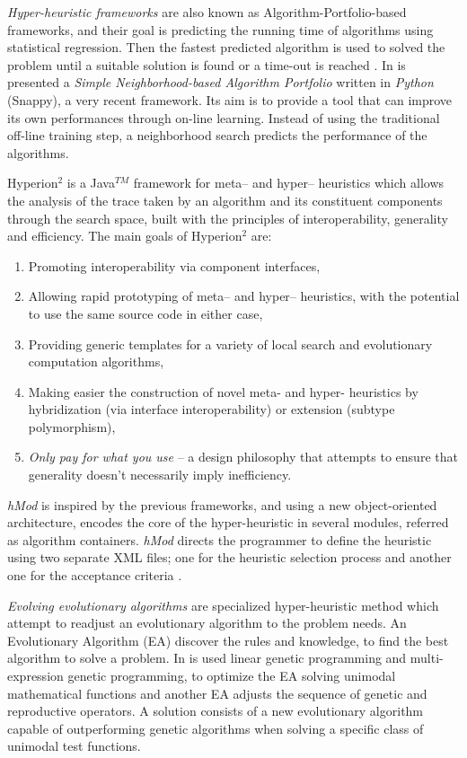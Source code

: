 \textit{Hyper-heuristic frameworks} are also known as Algorithm-Portfolio-based frameworks, and their goal is predicting the running time of algorithms using statistical regression. Then the fastest predicted algorithm is used to solved the problem until a suitable solution is found or a time-out is reached \cite{Leyton-Brown2003}. In \cite{Samulowitz2013} is presented a \textit{Simple Neighborhood-based Algorithm Portfolio} written in \textit{Python} (Snappy), a very recent framework. Its aim is to provide a tool that can improve its own performances through on-line learning. Instead of using the traditional off-line training step, a neighborhood search predicts the performance of the algorithms.

{\sc Hyperion}$^2$ \cite{Brownlee2014} is a Java$^{TM}$ framework for meta-- and hyper-- heuristics which allows the analysis of the trace taken by an algorithm and its constituent components through the search space, built with the principles of interoperability, generality and efficiency. The main goals of {\sc Hyperion}$^2$ are:
\begin{enumerate} %
\item Promoting interoperability via component interfaces,
\item Allowing rapid prototyping of meta-- and hyper-- heuristics, with the potential to use the same source code in either case,
\item Providing generic templates for a variety of local search and evolutionary computation algorithms,
\item Making easier the construction of novel meta- and hyper- heuristics by hybridization (via interface interoperability) or extension (subtype polymorphism),
\item {\it Only pay for what you use} -- a design philosophy that attempts to ensure that generality doesn't necessarily imply inefficiency.
\end{enumerate}%

\textit{hMod} is inspired by the previous frameworks, and using a new object-oriented architecture, encodes the core of the hyper-heuristic in several modules, referred as algorithm containers. \textit{hMod} directs the programmer to define the heuristic using two separate XML files; one for the heuristic selection process and another one for the acceptance criteria \cite{Urra2013}.

\textit{Evolving evolutionary algorithms} are specialized hyper-heuristic method which attempt to readjust an evolutionary algorithm to the problem needs. An Evolutionary Algorithm (EA) discover the rules and knowledge, to find the best algorithm to solve a problem. In \cite{Diosan2009} is used linear genetic programming and multi-expression genetic programming, to optimize the EA solving unimodal mathematical functions and another EA adjusts the sequence of genetic and reproductive operators. A solution consists of a new evolutionary algorithm capable of outperforming genetic algorithms when solving a specific class of unimodal test functions. 

